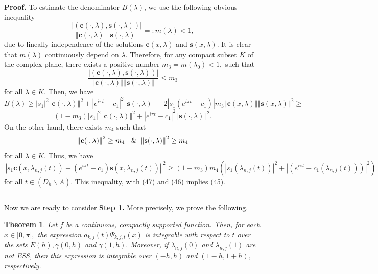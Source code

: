 \documentclass{article}%
\newtheorem{theorem}{Theorem}
{}
\newenvironment{proof}[1][Proof]{\textbf{#1.} }{\ \rule{0.5em}{0.5em}}
\begin{document}
\begin{proof}
To estimate the denominator $B(\lambda)$, we use the following obvious
inequality%
\[
\frac{\left\vert (\mathbf{c}(\cdot,\lambda),\mathbf{s}(\cdot,\lambda
))\right\vert }{\left\Vert \mathbf{c}(\cdot,\lambda)\right\Vert \left\Vert
\mathbf{s}(\cdot,\lambda)\right\Vert }=:m(\lambda)<1,
\]
due to lineally independence of the solutions $\mathbf{c}(x,\lambda)$ and
$\mathbf{s}(x,\lambda).$ It is clear that $m(\lambda)$ continuously depend on
$\lambda.$ Therefore, for any compact subset $K$ of the complex plane, there
exists a positive number $m_{3}=m(\lambda_{0})<1,$ such that
\[
\frac{\left\vert (\mathbf{c}(\cdot,\lambda),\mathbf{s}(\cdot,\lambda
))\right\vert }{\left\Vert \mathbf{c}(\cdot,\lambda)\right\Vert \left\Vert
\mathbf{s}(\cdot,\lambda)\right\Vert }\leq m_{3}%
\]
for all $\lambda\in K.$ Then, we have
\[
B(\lambda)\geq\left\vert s_{1}\right\vert ^{2}\left\Vert \mathbf{c}%
(\cdot,\lambda)\right\Vert ^{2}+\left\vert e^{i\pi t}-c_{1}\right\vert
^{2}\left\Vert \mathbf{s}(\cdot,\lambda)\right\Vert -2\left\vert s_{1}\left(
e^{i\pi t}-c_{1}\right)  \right\vert m_{3}\left\Vert \mathbf{c}(x,\lambda
)\right\Vert \left\Vert \mathbf{s}(x,\lambda)\right\Vert ^{2}\geq
\]%
\[
(1-m_{3})\left\vert s_{1}\right\vert ^{2}\left\Vert \mathbf{c}(\cdot
,\lambda)\right\Vert ^{2}+\left\vert e^{i\pi t}-c_{1}\right\vert
^{2}\left\Vert \mathbf{s}(\cdot,\lambda)\right\Vert ^{2}.
\]
On the other hand, there exists $m_{4}$ such that
\[
\left\Vert \mathbf{c}(\cdot,\lambda)\right\Vert ^{2}\geq m_{4}\text{ }%
\And\left\Vert \mathbf{s}(\cdot,\lambda)\right\Vert ^{2}\geq m_{4}%
\]
for all $\lambda\in K.$ Thus, we have
\[
\left\Vert s_{1}\mathbf{c}(x,\lambda_{n,j}(t))+\left(  e^{i\pi t}%
-c_{1}\right)  \mathbf{s}(x,\lambda_{n,j}(t))\right\Vert ^{2}\geq
(1-m_{3})m_{4}(\left\vert s_{1}(\lambda_{n,j}(t))\right\vert ^{2}+\left\vert
\left(  e^{i\pi t}-c_{1}(\lambda_{n,j}(t))\right)  \right\vert ^{2})
\]
for all $t\in\left(  D_{h}\backslash\overline{A}\right)  .$ This inequality,
with (47) and (46) implies (45).
\end{proof}

Now we are ready to consider \textbf{Step 1.} More precisely, we prove the following.

\begin{theorem}
Let $f$ be a continuous, compactly supported function. Then, for each
$x\in\lbrack0,\pi],$ the expression $a_{k,j}(t)\Psi_{k,j,t}(x)$ is integrable
with respect to $t$ over the sets $E(h),\gamma(0,h)$ and $\gamma(1,h).$
Moreover, if $\lambda_{n,j}(0)$ and $\lambda_{n,j}(1)$ are not ESS, then this
expression is integrable over $(-h,h)$ and $(1-h,1+h)$, respectively.
\end{theorem}
\end{document}
